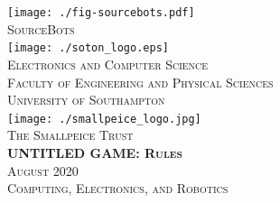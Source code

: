 \documentclass[twoside,12pt,a4paper,titlepage]{article}
\title{\gamename}
\author{\org}
\date{\timeline}
\newcommand{\gamename}{UNTITLED GAME\xspace}
\newcommand{\timeline}{August 2020\xspace}
\begin{document}
\begin{titlepage}
\begin{center}
\texttt{[image: ./fig-sourcebots.pdf]}~\\[1cm]
\textsc{\large SourceBots}~\\[1.8cm]
\texttt{[image: ./soton\_logo.eps]}~\\[1cm]
\textsc{\large Electronics and Computer Science}\\[0.2cm]
\textsc{\large Faculty of Engineering and Physical Sciences}\\[0.2cm]
\textsc{\large University of Southampton}\\[1.8cm]
\texttt{[image: ./smallpeice\_logo.jpg]}~\\[0.2cm]
\textsc{\large The Smallpeice Trust}\\[1.8cm]
\textsc{\huge \textbf{\gamename{}: Rules}}\\[1cm]
\textsc{\large \timeline}\\[1.2cm]
\textsc{\Large Computing, Electronics, and Robotics}
\end{center}
\end{titlepage}


\clearpage

\clearpage

\end{document}
